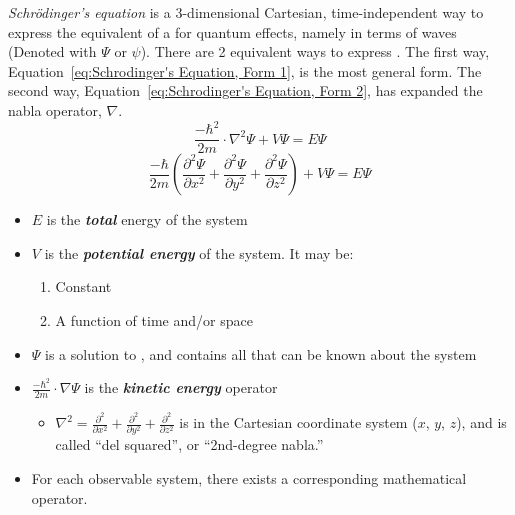 \begin{definition}\label{def:Schrodinger's Equation}
  \emph{Schr\"{o}dinger's equation} is a 3-dimensional Cartesian, time-independent way to express the equivalent of a  for quantum effects, namely in terms of waves (Denoted with $\Psi$ or $\psi$).
  There are 2 equivalent ways to express .
  The first way, Equation~\eqref{eq:Schrodinger's Equation, Form 1}, is the most general form.
  The second way, Equation~\eqref{eq:Schrodinger's Equation, Form 2}, has expanded the nabla operator, $\nabla$.
  \begin{equation}\label{eq:Schrodinger's Equation, Form 1}
    \frac{- \hbar^{2}}{2m} \cdot \nabla^{2} \Psi + V\Psi = E\Psi
  \end{equation}
  \begin{equation}\label{eq:Schrodinger's Equation, Form 2}
    \frac{-\hbar}{2m} \left( \frac{\partial^{2} \Psi}{\partial x^{2}} + \frac{\partial^{2} \Psi}{\partial y^{2}} + \frac{\partial^{2} \Psi}{\partial z^{2}} \right) + V\Psi = E\Psi
  \end{equation}
  \begin{itemize}[noitemsep, nolistsep]
  \item $E$ is the \emph{\textbf{total}} energy of the system
  \item $V$ is the \emph{\textbf{potential energy}} of the system. It may be:
    \begin{enumerate}
    \item Constant
    \item A function of time and/or space
    \end{enumerate}
  \item $\Psi$ is a solution to , and contains all that can be known about the system
  \item $\frac{-\hbar^{2}}{2m} \cdot \nabla\Psi$ is the \emph{\textbf{kinetic energy}} operator
    \begin{itemize}[noitemsep, nolistsep]
    \item $\nabla^{2} = \frac{\partial^{2}}{\partial x^{2}} + \frac{\partial^{2}}{\partial y^{2}} + \frac{\partial^{2}}{\partial z^{2}}$ is in the Cartesian coordinate system ($x$, $y$, $z$), and is called ``del squared'', or ``2nd-degree nabla.''
    \end{itemize}
  \item For each observable system, there exists a corresponding mathematical operator.

\end{itemize}
\end{definition}
